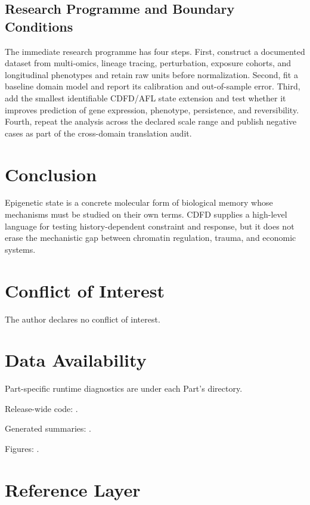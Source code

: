 \documentclass[11pt,a4paper]{article}
\begin{document}
\subsection{Research Programme and Boundary Conditions}

The immediate research programme has four steps. First, construct a documented
dataset from multi-omics, lineage tracing, perturbation, exposure cohorts, and longitudinal phenotypes and retain raw units before normalization.
Second, fit a baseline domain model and report its calibration and out-of-sample
error. Third, add the smallest identifiable CDFD/AFL state extension and test
whether it improves prediction of gene expression, phenotype, persistence, and reversibility. Fourth, repeat the
analysis across the declared scale range and publish negative cases as part of
the cross-domain translation audit.


\section{Conclusion}
Epigenetic state is a concrete molecular form of biological memory whose mechanisms must be studied on their own terms. CDFD supplies a high-level language for testing history-dependent constraint and response, but it does not erase the mechanistic gap between chromatin regulation, trauma, and economic systems.
\section*{Conflict of Interest} The author declares no conflict of interest.
\section*{Data Availability}
Part-specific runtime diagnostics are under each Part's  directory.

Release-wide code: .

Generated summaries: .

Figures: .


\section{Reference Layer}


\end{document}
